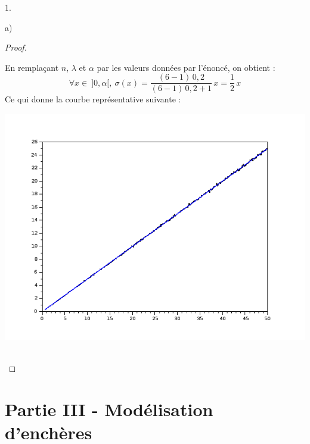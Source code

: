 \documentclass[11pt]{article}%
\begin{document}
\begin{noliste}{1.}
\begin{noliste}{a)}
\begin{proof}
      \begin{remark}
        En remplaçant $n$, $\lambda$ et $\alpha$ par les valeurs données
        par l'énoncé, on obtient :
        \[
          \forall x \in \ ]0,\alpha[, \ \sigma(x)  = \dfrac{(6-1) 
          \, 0,2}{(6-1) \, 0,2 +1} \, x = \dfrac{1}{2} \, x
        \]
        Ce qui donne la courbe représentative suivante :
        
        \begin{center}
	  \includegraphics[scale=.37]
	  {Figures/ESSEC-I_2018/Figure2_ESSEC-I_2018.png}
        \end{center}
      \end{remark}~\\[-1.4cm]
    \end{proof}
  \end{noliste}
\end{noliste}



\newpage



\section*{Partie III - Modélisation d'enchères}
\end{document}

